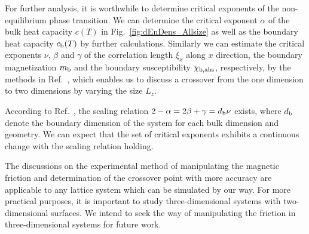 %
For further analysis, it is worthwhile to determine critical exponents of the non-equilibrium phase transition. We can determine the critical exponent $\alpha$ of the bulk heat capacity $c(T)$ in Fig.~\ref{fig:dEnDens_Allsize} as well as the boundary heat capacity $c_{\rm b}(T)$ by further calculations. Similarly we can estimate the critical exponents $\nu$, $\beta$ and $\gamma$ of the correlation length $\xi_{x}$ along $x$ direction, the boundary magnetization $m_{\rm b}$ and the boundary susceptibility $\chi_{\rm b, abs}$, respectively, by the methods in Ref.~\cite{Hucht2009b}, which enables us to discuss a crossover from the one dimension to two dimensions by varying the size $L_{z}$.

According to Ref.~\cite{Hucht2009b}, the scaling relation $2-\alpha=2\beta+\gamma=d_{\rm b}\nu$ exists, where $d_{\rm b}$ denote the boundary dimension of the system for each bulk dimension and geometry. We can expect that the set of critical exponents exhibits a continuous change with the scaling relation holding.

The discussions on the experimental method of manipulating the magnetic friction and determination of the crossover point with more accuracy are applicable to any lattice system which can be simulated by our way. For more practical purposes, it is important to study three-dimensional systems with two-dimensional surfaces. We intend to seek the way of manipulating the friction in three-dimensional systems for future work.
%
